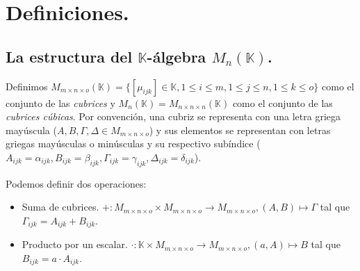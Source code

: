 \section{Definiciones.} \label{defs}

\subsection{La estructura del $\mathbb{K}$-álgebra $M_n (\mathbb{K})$.} \label{defs-structure}


Definimos $M_{m\times n\times o} (\mathbb{K}) = \{ [\mu_{ijk}] \in \mathbb{K}, 1 \le i \le m, 1 \le j \le n, 1 \le k \le o\}$ como el conjunto de las \textit{cubrices} y $M_n (\mathbb{K}) = M_{n\times n\times n} (\mathbb{K})$ como el conjunto de las \textit{cubrices cúbicas}. Por convención, una cubriz se representa con una letra griega mayúscula ($A, B, \Gamma, \Delta \in M_{m\times n\times o}$) y sus elementos se representan con letras griegas mayúsculas o minúsculas y su respectivo subíndice ($A_{ijk} = \alpha_{ijk}, B_{ijk} = \beta_{ijk}, \Gamma_{ijk} = \gamma_{ijk}, \Delta_{ijk} = \delta_{ijk}$).


Podemos definir dos operaciones:

\begin{itemize}
	\item Suma de cubrices. $+: M_{m\times n\times o} \times M_{m\times n\times o} \rightarrow M_{m\times n\times o}, (A, B) \mapsto \Gamma$ tal que $\Gamma_{ijk} = A_{ijk} + B_{ijk}$.
	\item Producto por un escalar. $\cdot: \mathbb{K} \times M_{m\times n\times o} \rightarrow M_{m\times n\times o}, (a, A) \mapsto B$ tal que $B_{ijk} = a \cdot A_{ijk}$.
\end{itemize}

